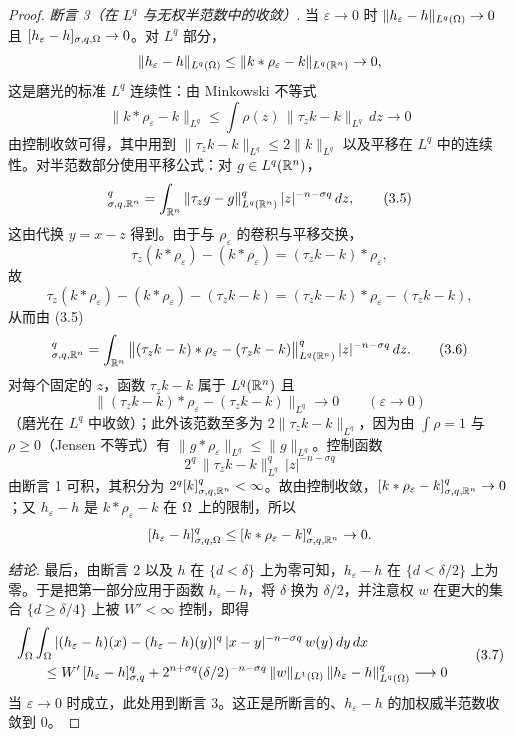 \begin{proof}
\emph{断言 3（在 $L^q$ 与无权半范数中的收敛）}. 当 $\varepsilon\to0$ 时 $\|h_\varepsilon-h\|_{L^q(\Omega)}\to0$ 且 $[h_\varepsilon-h]_{\sigma,q,\Omega}\to0$。对 $L^q$ 部分，
\[
  \|h_\varepsilon-h\|_{L^q(\Omega)}\le\|k*\rho_\varepsilon-k\|_{L^q(\mathbb{R}^n)}\to0 ,
\]
这是磨光的标准 $L^q$ 连续性：由 Minkowski 不等式
\[
  \|k*\rho_\varepsilon-k\|_{L^q}\le\int\rho(z)\,\|\tau_z k-k\|_{L^q}\,dz\to0
\]
由控制收敛可得，其中用到 $\|\tau_z k-k\|_{L^q}\le2\|k\|_{L^q}$ 以及平移在 $L^q$ 中的连续性。对半范数部分使用平移公式：对 $g\in L^q(\mathbb{R}^n)$，
\begin{equation}
  [g]^q_{\sigma,q,\R^n}=\int_{\R^n}\|\tau_z g-g\|^q_{L^q(\R^n)}\,|z|^{-n-\sigma q}\,dz ,
  \tag{3.5}
\end{equation}
这由代换 $y=x-z$ 得到。由于与 $\rho_\varepsilon$ 的卷积与平移交换，
\[
  \tau_z(k*\rho_\varepsilon)-(k*\rho_\varepsilon)=(\tau_z k-k)*\rho_\varepsilon ,
\]
故
\[
  \tau_z(k*\rho_\varepsilon)-(k*\rho_\varepsilon)-(\tau_z k-k)=(\tau_z k-k)*\rho_\varepsilon-(\tau_z k-k),
\]
从而由 (3.5)
\begin{equation}
  [k*\rho_\varepsilon-k]^q_{\sigma,q,\R^n}
  =\int_{\R^n}\big\|(\tau_z k-k)*\rho_\varepsilon-(\tau_z k-k)\big\|^q_{L^q(\R^n)}\,|z|^{-n-\sigma q}\,dz .
  \tag{3.6}
\end{equation}
对每个固定的 $z$，函数 $\tau_z k-k$ 属于 $L^q(\mathbb{R}^n)$ 且
\[
  \big\|(\tau_z k-k)*\rho_\varepsilon-(\tau_z k-k)\big\|_{L^q}\to0
  \qquad(\varepsilon\to0)
\]
（磨光在 $L^q$ 中收敛）；此外该范数至多为 $2\|\tau_z k-k\|_{L^q}$，因为由 $\int\rho=1$ 与 $\rho\ge0$（Jensen 不等式）有 $\|g*\rho_\varepsilon\|_{L^q}\le\|g\|_{L^q}$。控制函数
\[
  2^q\,\|\tau_z k-k\|^q_{L^q}\,|z|^{-n-\sigma q}
\]
由断言 1 可积，其积分为 $2^q[k]^q_{\sigma,q,\mathbb{R}^n}<\infty$。故由控制收敛，$[k*\rho_\varepsilon-k]^q_{\sigma,q,\mathbb{R}^n}\to0$；又 $h_\varepsilon-h$ 是 $k*\rho_\varepsilon-k$ 在 $\Omega$ 上的限制，所以
\[
  [h_\varepsilon-h]^q_{\sigma,q,\Omega}\le[k*\rho_\varepsilon-k]^q_{\sigma,q,\mathbb{R}^n}\to0 .
\]

\emph{结论}. 最后，由断言 2 以及 $h$ 在 $\{d<\delta\}$ 上为零可知，$h_\varepsilon-h$ 在 $\{d<\delta/2\}$ 上为零。于是把第一部分应用于函数 $h_\varepsilon-h$，将 $\delta$ 换为 $\delta/2$，并注意权 $w$ 在更大的集合 $\{d\ge\delta/4\}$ 上被 $W'<\infty$ 控制，即得
\begin{equation}
\begin{split}
  &\int_\Omega\int_\Omega |(h_\varepsilon-h)(x)-(h_\varepsilon-h)(y)|^q\,|x-y|^{-n-\sigma q}\,w(y)\,dy\,dx \\
  &\qquad\le W'\,[h_\varepsilon-h]^q_{\sigma,q}
  +2^{n+\sigma q}(\delta/2)^{-n-\sigma q}\,\|w\|_{L^1(\Omega)}\,\|h_\varepsilon-h\|^q_{L^q(\Omega)}\longrightarrow0
\end{split}
  \tag{3.7}
\end{equation}
当 $\varepsilon\to0$ 时成立，此处用到断言 3。这正是所断言的、$h_\varepsilon-h$ 的加权威半范数收敛到 $0$。
\end{proof}

